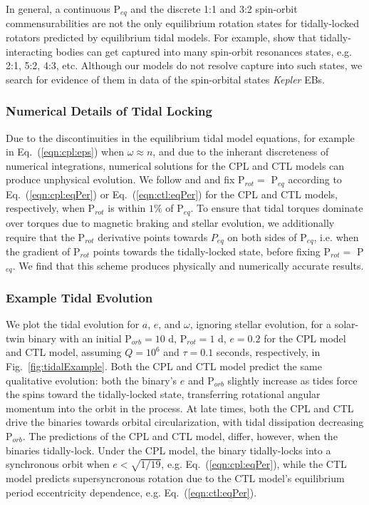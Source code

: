 \documentclass[twocolumn]{aastex61}
\newcommand{\kepler}[0]{\textit{Kepler}\xspace}
\begin{document}
In general, a continuous P$_{eq}$ and the discrete 1:1 and 3:2 spin-orbit commensurabilities are not the only equilibrium rotation states for tidally-locked rotators predicted by equilibrium tidal models. For example, \citet{Rodriguez2012} show that tidally-interacting bodies can get captured into many spin-orbit resonances states, e.g. 2:1, 5:2, 4:3, etc. Although our models do not resolve capture into such states, we search for evidence of them in data of the spin-orbital states \kepler EBs.

\subsubsection{Numerical Details of Tidal Locking}

Due to the discontinuities in the equilibrium tidal model equations, for example in Eq.~(\ref{eqn:cpl:eps}) when $\omega \approx n$, and due to the inherant discreteness of numerical integrations, numerical solutions for the CPL and CTL models can produce unphysical evolution. We follow \citet{Barnes2013} and \citet{Fleming2018} and fix P$_{rot} = $ P$_{eq}$ according to Eq.~(\ref{eqn:cpl:eqPer}) or Eq.~(\ref{eqn:ctl:eqPer}) for the CPL and CTL models, respectively, when P$_{rot}$ is within $1\%$ of P$_{eq}$.  To ensure that tidal torques dominate over torques due to magnetic braking and stellar evolution, we additionally require that the P$_{rot}$ derivative points towards $P_{eq}$ on both sides of P$_{eq}$, i.e. when the gradient of P$_{rot}$ points towards the tidally-locked state, before fixing P$_{rot} = $ P$_{eq}$. We find that this scheme produces physically and numerically accurate results. 

\subsubsection{Example Tidal Evolution} \label{sec:methods:eqtideExample}

We plot the tidal evolution for $a$, $e$, and $\omega$, ignoring stellar evolution, for a solar-twin binary with an initial P$_{orb} = 10$ d, P$_{rot} = 1$ d, $e = 0.2$ for the CPL model and CTL model, assuming $Q=10^6$ and $\tau = 0.1$ seconds, respectively, in Fig.~\ref{fig:tidalExample}. Both the CPL and CTL model predict the same qualitative evolution: both the binary's $e$ and P$_{orb}$ slightly increase as tides force the spins toward the tidally-locked state, transferring rotational angular momentum into the orbit in the process.  At late times, both the CPL and CTL drive the binaries towards orbital circularization, with tidal dissipation decreasing P$_{orb}$. The predictions of the CPL and CTL model, differ, however, when the binaries tidally-lock.  Under the CPL model, the binary tidally-locks into a synchronous orbit when $e < \sqrt{1/19}$, e.g. Eq.~(\ref{eqn:cpl:eqPer}), while the CTL model predicts supersyncronous rotation due to the CTL model's equilibrium period eccentricity dependence, e.g. Eq.~(\ref{eqn:ctl:eqPer}).
\end{document}
